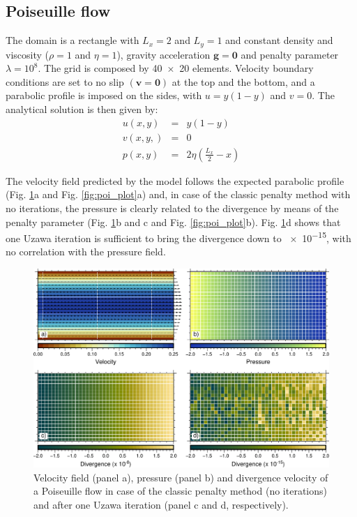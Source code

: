 \documentclass[hidelinks,10pt,a4paper]{article}
\begin{document}
\subsection{Poiseuille flow}\label{sec:poiseuille}
The domain is a rectangle with $L_x=2$ and $L_y=1$ and constant density and viscosity ($\rho=1$ and $\eta=1$), gravity acceleration $\bm{g}=\bm{0}$ and penalty
parameter $\lambda=10^8$. The grid is composed by \num{40x20} elements. Velocity boundary conditions are set to no slip $(\bm{v}=\bm{0})$ at the top and the
bottom, and a parabolic profile is imposed on the sides, with $u=y(1-y)$ and $v=0$. The analytical solution is then given by:
\begin{eqnarray}
u(x,y)&=&y(1-y)\nonumber \\
v(x,y,)&=&0\nonumber \\
p(x,y)&=&2\eta\left(\frac{L_x}{2}-x\right)\nonumber
\end{eqnarray}

The velocity field predicted by the model follows the expected parabolic profile (Fig. \ref{fig:poiseuille}a and Fig. \ref{fig:poi_plot}a) and, in case of the
classic penalty method with no iterations, the pressure is clearly related to the divergence by means of the penalty parameter (Fig. \ref{fig:poiseuille}b and
c and Fig. \ref{fig:poi_plot}b). Fig. \ref{fig:poiseuille}d shows that one Uzawa iteration is sufficient to bring the divergence down to \num{e-15}, with no
correlation with the pressure field.

\begin{figure}
\noindent\includegraphics[width=\textwidth]{./Figures/Poiseuille.pdf}
\caption{Velocity field (panel a), pressure (panel b) and divergence velocity of a Poiseuille flow in case of the classic penalty method (no iterations) and
after one Uzawa iteration (panel c and d, respectively).}
\label{fig:poiseuille}
\end{figure}
\end{document}
